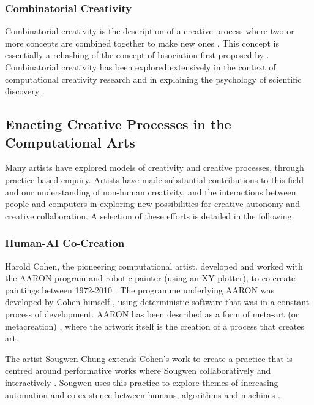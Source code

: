 \subsubsection{Combinatorial Creativity}

Combinatorial creativity is the description of a creative process where two or more concepts are combined together to make new ones \citep{boden2004creative}. 
This concept is essentially a rehashing of the concept of bisociation first proposed by \cite{koestler1964act}. 
Combinatorial creativity has been explored extensively in the context of computational creativity research \citep{zarraonandia2017using, guzdial2018combinets, guzdial2018combinatorial} and in explaining the psychology of scientific discovery \citep{simonton2021scientific, simonton2022serendipity}.

\subsection{Enacting Creative Processes in the Computational Arts}

Many artists have explored models of creativity and creative processes, through practice-based enquiry. 
Artists have made substantial contributions to this field and our understanding of non-human creativity, and the interactions between people and computers in exploring new possibilities for creative autonomy and creative collaboration.
A selection of these efforts is detailed in the following.

\subsubsection{Human-AI Co-Creation}

Harold Cohen, the pioneering computational artist. developed and worked with the AARON program and robotic painter (using an XY plotter), to co-create paintings between 1972-2010 \citep{cohen2016harold}. 
The programme underlying AARON was developed by Cohen himself \citep{cohen1995further}, using deterministic software that was in a constant process of development. 
AARON has been described as a form of meta-art (or metacreation) \citep{mccorduck1991aaron}, where the artwork itself is the creation of a process that creates art.

The artist Sougwen Chung extends Cohen's work to create a practice that is centred around performative works where Sougwen collaboratively and interactively \citep{benediktsson2019human}.
Sougwen uses this practice to explore themes of increasing automation and co-existence between humans, algorithms and machines \citep{voss2021conversation}.


